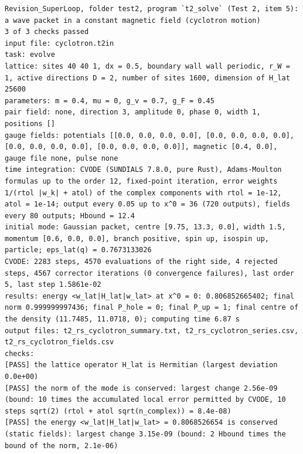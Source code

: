 \documentclass[
  10pt,
]{article}
\begin{document}
\begin{verbatim}
Revision_SuperLoop, folder test2, program `t2_solve` (Test 2, item 5): a wave packet in a constant magnetic field (cyclotron motion)
3 of 3 checks passed
input file: cyclotron.t2in
task: evolve
lattice: sites 40 40 1, dx = 0.5, boundary wall wall periodic, r_W = 1, active directions D = 2, number of sites 1600, dimension of H_lat 25600
parameters: m = 0.4, mu = 0, g_v = 0.7, g_F = 0.45
pair field: none, direction 3, amplitude 0, phase 0, width 1, positions []
gauge fields: potentials [[0.0, 0.0, 0.0, 0.0], [0.0, 0.0, 0.0, 0.0], [0.0, 0.0, 0.0, 0.0], [0.0, 0.0, 0.0, 0.0]], magnetic [0.4, 0.0], gauge file none, pulse none
time integration: CVODE (SUNDIALS 7.8.0, pure Rust), Adams-Moulton formulas up to the order 12, fixed-point iteration, error weights 1/(rtol |w_k| + atol) of the complex components with rtol = 1e-12, atol = 1e-14; output every 0.05 up to x^0 = 36 (720 outputs), fields every 80 outputs; Hbound = 12.4
initial mode: Gaussian packet, centre [9.75, 13.3, 0.0], width 1.5, momentum [0.6, 0.0, 0.0], branch positive, spin up, isospin up, particle; eps_lat(q) = 0.7673133026
CVODE: 2283 steps, 4570 evaluations of the right side, 4 rejected steps, 4567 corrector iterations (0 convergence failures), last order 5, last step 1.5861e-02
results: energy <w_lat|H_lat|w_lat> at x^0 = 0: 0.806852665402; final norm 0.999999997436; final P_hole = 0; final P_up = 1; final centre of the density (11.7485, 11.0718, 0); computing time 6.87 s
output files: t2_rs_cyclotron_summary.txt, t2_rs_cyclotron_series.csv, t2_rs_cyclotron_fields.csv
checks:
[PASS] the lattice operator H_lat is Hermitian (largest deviation 0.0e+00)
[PASS] the norm of the mode is conserved: largest change 2.56e-09 (bound: 10 times the accumulated local error permitted by CVODE, 10 steps sqrt(2) (rtol + atol sqrt(n_complex)) = 8.4e-08)
[PASS] the energy <w_lat|H_lat|w_lat> = 0.8068526654 is conserved (static fields): largest change 3.15e-09 (bound: 2 Hbound times the bound of the norm, 2.1e-06)
\end{verbatim}
\end{document}
